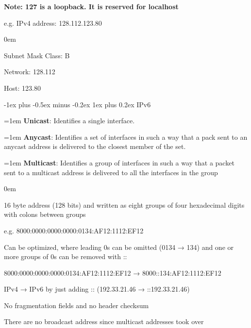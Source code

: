 \documentclass[letterpaper,8pt]{extarticle}
\makeatletter
\newcommand{\definition}[2]{
  \hangindent=1em
  \textbf{#1}: #2%
}
\renewcommand{\subsubsection}{\@startsection{subsubsection}{3}{0mm}%
  {-1ex plus -0.5ex minus -0.2ex}%
  {1ex plus 0.2ex}%
{\color{h3} \normalfont\fontsize{5.5}{5.5}\selectfont\bfseries\itshape}}
\let\olditemize\itemize \let\endolditemize\enditemize
\renewenvironment{itemize}{\olditemize \itemsep0em}{\endolditemize}
\makeatother
\begin{document}
\begin{multicols*}{5}
\begin{multicols}{2}
    \textbf{Note: 127 is a loopback. It is reserved for localhost}

    \columnbreak

    e.g. IPv4 address: 128.112.123.80

    \begin{itemize}
      \item Subnet Mask Class: B
      \item Network: 128.112
      \item Host: 123.80
    \end{itemize}
  \end{multicols}

  \vspace{0.2cm}

  \subsubsection{IPv6}

  \definition{Unicast}{Identifies a single interface.}

  \definition{Anycast}{Identifies a set of interfaces in such a way that a pack sent to an anycast address is delivered to the closest member of the set.}

  \definition{Multicast}{Identifies a group of interfaces in such a way that a packet sent to a multicast address is delivered to all the interfaces in the group}

  \begin{itemize}
    \item 16 byte address (128 bits) and written as eight groups of four hexadecimal digits with colons between groups
    \item e.g. 8000:0000:0000:0000:0134:AF12:1112:EF12
    \item Can be optimized, where leading 0s can be omitted (0134 → 134) and one or more groups of 0s can be removed with ::
    \item 8000:0000:0000:0000:0134:AF12:1112:EF12 → 8000::134:AF12:1112:EF12
    \item IPv4 → IPv6 by just adding :: (192.33.21.46 → ::192.33.21.46)
    \item No fragmentation fields and no header checksum
    \item There are no broadcast address since multicast addresses took over
  \end{itemize}


\end{multicols*}
\end{document}
